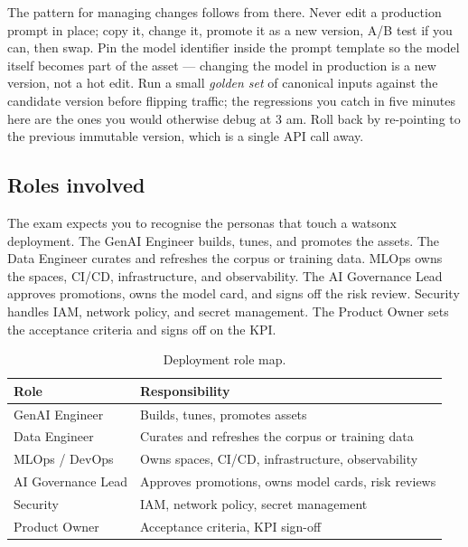 The pattern for managing changes follows from there. Never edit a production prompt in place; copy it, change it, promote it as a new version, A/B test if you can, then swap. Pin the model identifier inside the prompt template so the model itself becomes part of the asset --- changing the model in production is a new version, not a hot edit. Run a small \emph{golden set} of canonical inputs against the candidate version before flipping traffic; the regressions you catch in five minutes here are the ones you would otherwise debug at 3 am. Roll back by re-pointing to the previous immutable version, which is a single API call away.

\subsection{Roles involved}

The exam expects you to recognise the personas that touch a watsonx deployment. The GenAI Engineer builds, tunes, and promotes the assets. The Data Engineer curates and refreshes the corpus or training data. MLOps owns the spaces, CI/CD, infrastructure, and observability. The AI Governance Lead approves promotions, owns the model card, and signs off the risk review. Security handles IAM, network policy, and secret management. The Product Owner sets the acceptance criteria and signs off on the KPI.

\begin{table}[h]
\centering
\small
\begin{tabularx}{\textwidth}{l X}
\toprule
\textbf{Role}              & \textbf{Responsibility} \\
\midrule
GenAI Engineer             & Builds, tunes, promotes assets \\
Data Engineer              & Curates and refreshes the corpus or training data \\
MLOps / DevOps             & Owns spaces, CI/CD, infrastructure, observability \\
AI Governance Lead         & Approves promotions, owns model cards, risk reviews \\
Security                   & IAM, network policy, secret management \\
Product Owner              & Acceptance criteria, KPI sign-off \\
\bottomrule
\end{tabularx}
\caption{Deployment role map.}
\label{tab:roles}
\end{table}

